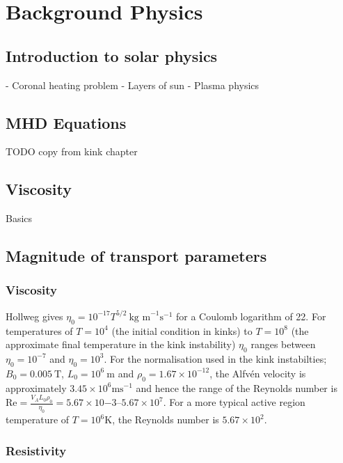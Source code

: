 \chapter{Background Physics}

\section{Introduction to solar physics}

- Coronal heating problem
- Layers of sun
- Plasma physics

\section{MHD Equations}

TODO copy from kink chapter

\section{Viscosity}

Basics

\section{Magnitude of transport parameters}

\subsection{Viscosity}

Hollweg gives $\eta_0 = 10^{-17} T^{5/2}\ \text{kg m}^{-1} \text{s}^{-1}$ for a Coulomb logarithm of 22. For temperatures of $T=10^4$ (the initial condition in kinks) to $T=10^8$ (the approximate final temperature in the kink instability) $\eta_0$ ranges between $\eta_0 = 10^{-7}$ and $\eta_0 = 10^3$. For the normalisation used in the kink instabilties; $B_0 = 0.005\ \text{T}$, $L_0 = 10^6\ \text{m}$ and $\rho_0 = 1.67 \times 10^{-12}$, the Alfv\'en velocity is approximately $3.45 \times 10^6 \text{ms}^{-1}$ and hence the range of the Reynolds number is $\text{Re} = \frac{V_A L_0 \rho_0}{\eta_0} = 5.67 \times 10{-3}$--$5.67 \times 10^{7}$. For a more typical active region temperature of $T=10^6 \text{K}$, the Reynolds number is $5.67 \times 10^2$. 

\subsection{Resistivity}

